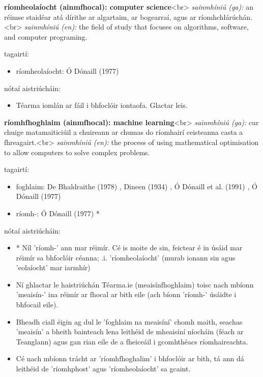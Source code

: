\documentclass{article}
\begin{document}
\textbf{ríomheolaíocht (ainmfhocal): computer science}<br>
\textit{sainmhíniú (ga):} an réimse staidéar atá dírithe ar algartaim, ar bogearraí, agus ar ríomhchlárúchán.<br>
\textit{sainmhíniú (en):} the field of study that focuses on algorithms, software, and computer programing.

tagairtí:
\begin{itemize}
	\item ríomheolaíocht: Ó Dónaill (1977) \cite{odonaill}
\end{itemize}

nótaí aistriúcháin:
\begin{itemize}
	\item Téarma iomlán ar fáil i bhfoclóir iontaofa. Glactar leis.
\end{itemize}


\textbf{ríomhfhoghlaim (ainmfhocal): machine learning}<br>
\textit{sainmhíniú (ga):} cur chuige matamaiticiúil a chuireann ar chumas do ríomhairí ceisteanna casta a fhreagairt.<br>
\textit{sainmhíniú (en):} the process of using mathematical optimisation to allow computers to solve complex problems.

tagairtí:
\begin{itemize}
	\item foghlaim: De Bhaldraithe (1978) \cite{de-bhaldraithe}, Dineen (1934) \cite{dineen}, Ó Dónaill et al. (1991) \cite{focloir-beag}, Ó Dónaill (1977) \cite{odonaill}
	\item ríomh-: Ó Dónaill (1977) \cite{odonaill}*
\end{itemize}

nótaí aistriúcháin:
\begin{itemize}
	\item * Níl 'ríomh-' ann mar réimír. Cé is moite de sin, feictear é in úsáid mar réimír sa bhfoclóir céanna; .i. 'ríomheolaíocht' (murab ionann sin agus 'eolaíocht' mar iarmhír)
	\item Ní ghlactar le haistriúchán Téarma.ie (meaisínfhoghlaim) toisc nach mbíonn 'meaisín-' ina réimír ar fhocal ar bith eile (ach bíonn 'ríomh-' úsáidte i bhfocail eile).
	\item Bheadh ciall éigin ag dul le 'foghlaim na meaisíní' chomh maith, seachas 'meaisín' a bheith bainteach lena leithéid de mheaisíní níocháin (féach ar Teanglann) agus gan rian eile de a fheiceáil i gcomhthéacs ríomhaireachta.
	\item Cé nach mbíonn trácht ar 'ríomhfhoghalim' i bhfoclóir ar bith, tá ann dá leithéid de 'ríomhphost' agus 'ríomheolaíocht' sa gcaint.
\end{itemize}
\end{document}
